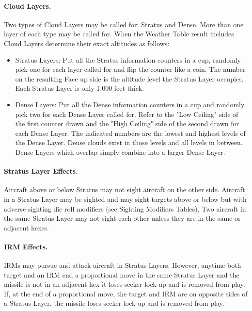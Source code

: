 \paragraph{Cloud Layers.} Two types of Cloud Layers may be called for: Stratus and Dense. More than one layer of each type may be called for. When the Weather Table result includes Cloud Layers determine their exact altitudes as follows:

\begin{itemize}
    \item Stratus Layers: Put all the Stratus information counters in a cup, randomly pick one for each layer called for and flip the counter like a coin. The number on the resulting Face up side is the altitude level the Stratus Layer occupies. Each Stratus Layer is only 1,000 feet thick.

    \item Dense Layers: Put all the Dense information counters in a cup and randomly pick two for each Dense Layer called for. Refer to the "Low Ceiling" side of the first counter drawn and the "High Ceiling" side of the second drawn for each Dense Layer. The indicated numbers are the lowest and highest levels of the Dense Layer. Dense clouds exist in those levels and all levels in between. Dense Layers which overlap simply combine into a larger Dense Layer.
\end{itemize}


\paragraph{Stratus Layer Effects.} Aircraft above or below Stratus may not sight aircraft on the other side. Aircraft in a Stratus Layer may be sighted and may sight targets above or below but with adverse sighting die roll modifiers (see Sighting Modifiers Tables). Two aircraft in the same Stratus Layer may not sight each other unless they are in the same or adjacent hexes.

\paragraph{IRM Effects.} IRMs may pursue and attack aircraft in Stratus Layers. However, anytime both target and an IRM end a proportional move in the same Stratus Layer and the missile is not in an adjacent hex it loses seeker lock-up and is removed from play. If, at the end of a proportional move, the target and IRM are on opposite sides of a Stratus Layer, the missile loses seeker lock-up and is removed from play.

